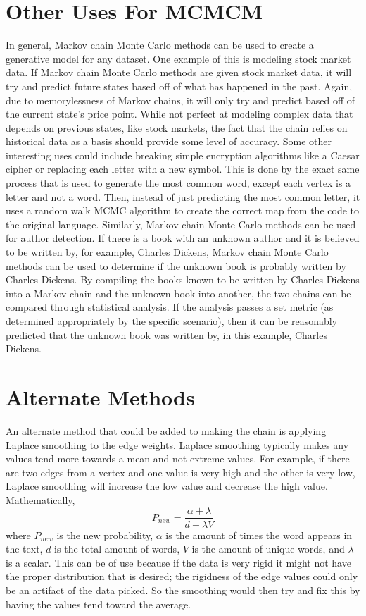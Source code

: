 \documentclass[9pt,twocolumn,twoside]{idsi}
\begin{document}
\section{Other Uses For MCMCM}
In general, Markov chain Monte Carlo methods can be used to create a generative model for any dataset. One example of this is modeling stock market data. If Markov chain Monte Carlo methods are given stock market data, it will try and predict future states based off of what has happened in the past. Again, due to memorylessness of Markov chains, it will only try and predict based off of the current state's price point. While not perfect at modeling complex data that depends on previous states, like stock markets, the fact that the chain relies on historical data as a basis should provide some level of accuracy. 
Some other interesting uses could include breaking simple encryption algorithms like a Caesar cipher or replacing each letter with a new symbol. This is done by the exact same process that is used to generate the most common word, except each vertex is a letter and not a word. Then, instead of just predicting the most common letter, it uses a random walk MCMC algorithm to create the correct map from the code to the original language.\cite{Diaconis:4} Similarly, Markov chain Monte Carlo methods can be used for author detection. If there is a book with an unknown author and it is believed to be written by, for example, Charles Dickens, Markov chain Monte Carlo methods can be used to determine if the unknown book is probably written by Charles Dickens. By compiling the books known to be written by Charles Dickens into a Markov chain and the unknown book into another, the two chains can be compared through statistical analysis. If the analysis passes a set metric (as determined appropriately by the specific scenario), then it can be reasonably predicted that the unknown book was written by, in this example, Charles Dickens.

\section{Alternate Methods}
An alternate method that could be added to making the chain is applying Laplace smoothing to the edge weights. Laplace smoothing typically makes any values tend more towards a mean and not extreme values. For example, if there are two edges from a vertex and one value is very high and the other is very low, Laplace smoothing will increase the low value and decrease the high value. Mathematically, 
\begin{equation}
P_{new} = \dfrac{\alpha + \lambda}{d + \lambda V}
\end{equation}
where $P_{new}$ is the new probability, $\alpha$ is the amount of times the word appears in the text, $d$ is the total amount of words, $V$ is the amount of unique words, and $\lambda$ is a scalar.\cite{Hockenmaier:6}
This can be of use because if the data is very rigid it might not have the proper distribution that is desired; the rigidness of the edge values could only be an artifact of the data picked. So the smoothing would then try and fix this by having the values tend toward the average.
\end{document}
